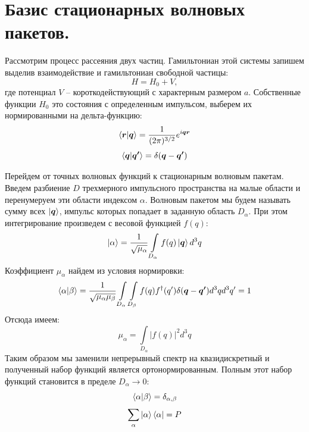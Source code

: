 \documentclass[a4paper,12pt]{article}
\newcommand{\vect}[1]{\boldsymbol{#1}}
\begin{document}

\newline
	\section{Базис стационарных волновых пакетов.}
Рассмотрим процесс рассеяния двух частиц. Гамильтониан этой системы запишем выделив взаимодействие и гамильтониан свободной частицы:
\[
	H = H_0 + V,
\]
где потенциал $V$ – короткодействующий с характерным размером $a$. Собственные функции $H_0$ это состояния с определенным импульсом, выберем их нормированными на дельта-функцию:
\[
	\braket{\vect{r}|\vect{q}} = \frac{1}{(2\pi)^{3/2}}e^{i\vect{q}\vect{r}} 
\]\[
	\braket{\vect{q}|\vect{q'}} = \delta(\vect{q} - \vect{q'})
\]

Перейдем от точных волновых функций к стационарным волновым пакетам. Введем разбиение $D$ трехмерного импульсного пространства на малые области и перенумеруем эти области индексом $\alpha$. Волновым пакетом мы будем называть сумму всех $\ket{\vect{q}}$, импульс которых попадает в заданную область $D_\alpha$. При этом интегрирование произведем с весовой функцией $f(q)$:
\[
	\ket{\alpha} = \frac{1}{\sqrt{\mu_\alpha}} \int\limits_{D_\alpha} f(q) \ket{\vect{q}} d^3q
\]
Коэффициент $\mu_\alpha$ найдем из условия нормировки:
\[
	\braket{\alpha|\beta} = \frac{1}{\sqrt{\mu_\alpha \mu_\beta}}  \int\limits_{D_\alpha}  \int\limits_{D_\beta} f(q)f^\dagger(q') \delta(\vect{q} - \vect{q'}) d^3q d^3q' = 1
\]
Отсюда имеем:
\[
	\mu_\alpha =  \int\limits_{D_\alpha} |f(q)|^2 d^3q
\]
Таким образом мы заменили непрерывный спектр на квазидискретный и полученный набор функций является ортонормированным. Полным этот набор функций становится в пределе $D_\alpha \to 0$:
\[
	\braket{\alpha|\beta} = \delta_{\alpha,\beta}
\]\[
	\sum\limits_\alpha \ket{\alpha}\bra{\alpha} = P
\]
\end{document}
